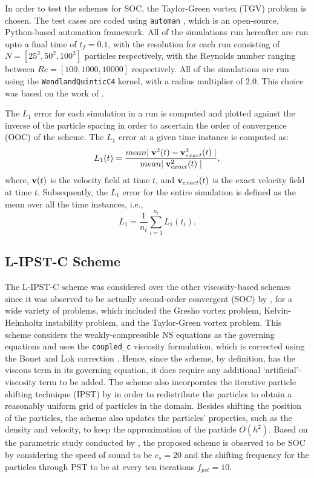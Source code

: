 In order to test the schemes for SOC, the Taylor-Green vortex (TGV) problem is chosen. The test cases are coded using \texttt{automan} \parencite{RamachandranAutoman2018}, which is an open-source, Python-based automation framework. All of the simulations run hereafter are run upto a final time of $t_f=0.1$, with the resolution for each run consisting of $N=[25^2, 50^2, 100^2]$ particles respectively, with the Reynolds number ranging between $Re=[100, 1000, 10000]$ respectively. All of the simulations are run using the \texttt{WendlandQuinticC4} kernel, with a radius multiplier of $2.0$. This choice was based on the work of \cite{Negi2022Techniques}.

The $L_1$ error for each simulation in a run is computed and plotted against the inverse of the particle spacing in order to ascertain the order of convergence (OOC) of the scheme. The $L_1$ error at a given time instance is computed as:
\begin{equation}
  L_1(t) = \frac{mean{\mid \mathbf{v}^2(t) - \mathbf{v}^2_{exact}(t) \mid}}{mean{\mid \mathbf{v}^2_{exact}(t) \mid}},
\end{equation}
where, $\mathbf{v}(t)$ is the velocity field at time $t$, and $\mathbf{v}_{exact}(t)$ is the exact velocity field at time $t$.
Subsequently, the $L_1$ error for the entire simulation is defined as the mean over all the time instances, i.e.,
\begin{equation}
  L_1 = \frac{1}{n_t} \sum_{i=1}^{n_t} L_1(t_i).
\end{equation}

\subsection{L-IPST-C Scheme}

The L-IPST-C scheme was considered over the other viscosity-based schemes since it was observed to be actually second-order convergent (SOC) by \cite{Negi2022Techniques}, for a wide variety of problems, which included the Gresho vortex problem, Kelvin-Helmholtz instability problem, and the Taylor-Green vortex problem. This scheme considers the weakly-compressible NS equations as the governing equations and uses the \texttt{coupled\_c} viscosity formulation, which is corrected using the Bonet and Lok correction \parencite{bonet1999variational}. Hence, since the scheme, by definition, has the viscous term in its governing equation, it does require any additional `artificial'-viscosity term to be added.
The scheme also incorporates the iterative particle shifting technique (IPST) by \cite{Huang_Long_Li_Liu_2019} in order to redistribute the particles to obtain a reasonably uniform grid of particles in the domain. Besides shifting the position of the particles, the scheme also updates the particles' properties, such as the density and velocity, to keep the approximation of the particle $O(h^2)$.
Based on the parametric study conducted by \cite{Negi2022Techniques}, the proposed scheme is observed to be SOC by considering the speed of sound to be $c_s = 20$ and the shifting frequency for the particles through PST to be at every ten iterations $f_{pst} = 10$.

